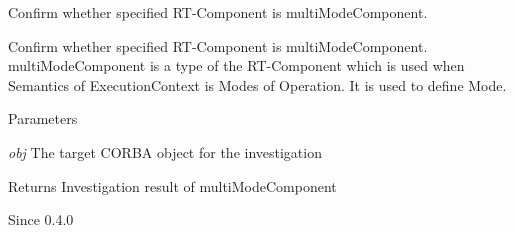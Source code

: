 Confirm whether specified RT-\/Component is multiModeComponent. 

Confirm whether specified RT-\/Component is multiModeComponent. multiModeComponent is a type of the RT-\/Component which is used when Semantics of ExecutionContext is Modes of Operation. It is used to define Mode.


\begin{DoxyParams}{Parameters}
\item[{\em obj}]The target CORBA object for the investigation\end{DoxyParams}
\begin{DoxyReturn}{Returns}
Investigation result of multiModeComponent
\end{DoxyReturn}
\begin{DoxySince}{Since}
0.4.0 
\end{DoxySince}
